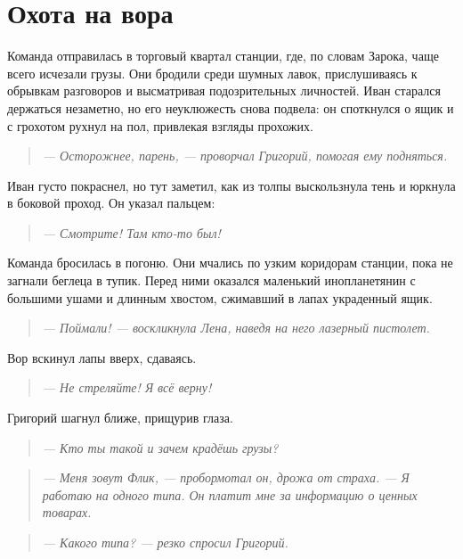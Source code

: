 \documentclass[12pt,a4paper]{book} %
\newenvironment{dialogue}{\begin{quote}\itshape}{\end{quote}}
\begin{document}
\section*{Охота на вора}

Команда отправилась в торговый квартал станции, где, по словам Зарока, чаще всего исчезали грузы. Они бродили среди шумных лавок, прислушиваясь к обрывкам разговоров и высматривая подозрительных личностей. Иван старался держаться незаметно, но его неуклюжесть снова подвела: он споткнулся о ящик и с грохотом рухнул на пол, привлекая взгляды прохожих.

\begin{dialogue}
--- Осторожнее, парень, --- проворчал Григорий, помогая ему подняться.
\end{dialogue}

Иван густо покраснел, но тут заметил, как из толпы выскользнула тень и юркнула в боковой проход. Он указал пальцем:

\begin{dialogue}
--- Смотрите! Там кто-то был!
\end{dialogue}

Команда бросилась в погоню. Они мчались по узким коридорам станции, пока не загнали беглеца в тупик. Перед ними оказался маленький инопланетянин с большими ушами и длинным хвостом, сжимавший в лапах украденный ящик.

\begin{dialogue}
--- Поймали! --- воскликнула Лена, наведя на него лазерный пистолет.
\end{dialogue}

Вор вскинул лапы вверх, сдаваясь.

\begin{dialogue}
--- Не стреляйте! Я всё верну!
\end{dialogue}

Григорий шагнул ближе, прищурив глаза.

\begin{dialogue}
--- Кто ты такой и зачем крадёшь грузы?
\end{dialogue}

\begin{dialogue}
--- Меня зовут Флик, --- пробормотал он, дрожа от страха. --- Я работаю на одного типа. Он платит мне за информацию о ценных товарах.
\end{dialogue}

\begin{dialogue}
--- Какого типа? --- резко спросил Григорий.
\end{dialogue}
\end{document}
